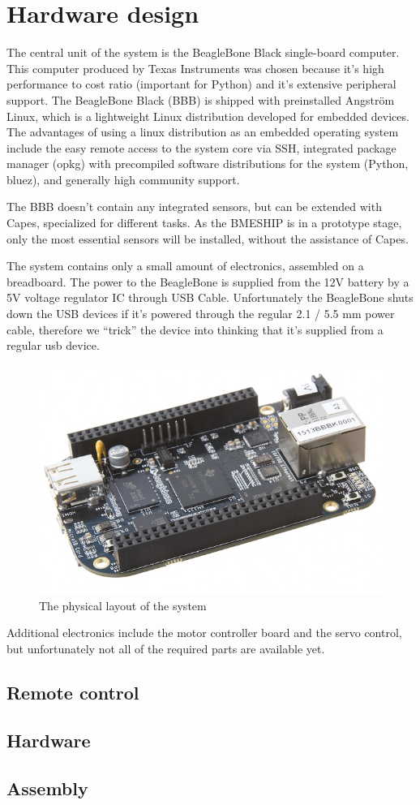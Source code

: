 \section{Hardware design}

The central unit of the system is the BeagleBone Black single-board computer. This computer produced by Texas Instruments was chosen because it's high performance to cost ratio (important for Python) and it's extensive peripheral support.
The BeagleBone Black (BBB) is shipped with preinstalled Angström Linux, which is a lightweight Linux distribution developed for embedded devices. The advantages of using a linux distribution as an embedded operating system include the easy remote access to the system core via SSH, integrated package manager (opkg) with precompiled software distributions for the system (Python, bluez), and generally high community support.

The BBB doesn't contain any integrated sensors, but can be extended with Capes, specialized for different tasks. As the BMESHIP is in a prototype stage, only the most essential sensors will be installed, without the assistance of Capes.

The system contains only a small amount of electronics, assembled on a breadboard. The power to the BeagleBone is supplied from the 12V battery by a 5V voltage regulator IC through USB Cable.
Unfortunately the BeagleBone shuts down the USB devices if it’s powered through the regular 2.1 / 5.5 mm power cable, therefore we “trick” the device into thinking that it’s supplied from a regular usb device.

\begin{figure}[H]
	\centering
	\includegraphics[width=1\textwidth]{img2/BeagleBone}
	\caption{The physical layout of the system}
	\label{fig:PhysicalLayout}
\end{figure}

Additional electronics include the motor controller board and the servo control, but unfortunately not all of the required parts are available yet.

\subsection{Remote control}

\subsection{Hardware}

\subsection{Assembly}